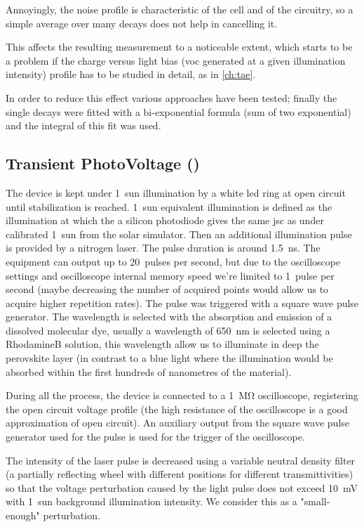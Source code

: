 			Annoyingly, the noise profile is characteristic of the cell and of the circuitry, so a simple average over many decays does not help in cancelling it.

			This affects the resulting measurement to a noticeable extent, which starts to be a problem if the charge versus light bias (\gls{voc} generated at a given illumination intensity) profile has to be studied in detail, as in \cref{ch:tae}.

			In order to reduce this effect various approaches have been tested; finally the single decays were fitted with a bi-exponential formula (sum of two exponential) and the integral of this fit was used.

	\subsection{Transient PhotoVoltage ()}

		The device is kept under 1~sun illumination by a white \gls{led} ring at open circuit until stabilization is reached. 1~sun equivalent illumination is defined as the illumination at which the a silicon photodiode gives the same \gls{jsc} as under calibrated 1~sun from the solar simulator. Then an additional illumination pulse is provided by a nitrogen laser. The pulse duration is around \SI{1.5}{\ns}. The equipment can output up to 20~pulses per second, but due to the oscilloscope settings and oscilloscope internal memory speed we're limited to 1~pulse per second (maybe decreasing the number of acquired points would allow us to acquire higher repetition rates). The pulse was triggered with a square wave pulse generator. The wavelength is selected with the absorption and emission of a dissolved molecular dye, usually a wavelength of \SI{650}{\nm} is selected using a RhodamineB solution\cite{RadiantDyesLaser}, this wavelength allow us to illuminate in deep the perovskite layer (in contrast to a blue light where the illumination would be absorbed within the first hundreds of nanometres of the material).

		During all the process, the device is connected to a \SI{1}{\Mohm} oscilloscope, registering the open circuit voltage profile (the high resistance of the oscilloscope is a good approximation of open circuit). An auxiliary output from the square wave pulse generator used for the pulse is used for the trigger of the oscilloscope.

		The intensity of the laser pulse is decreased using a variable neutral density filter (a partially reflecting wheel with different positions for different transmittivities) so that the voltage perturbation caused by the light pulse does not exceed \SI{10}{\mV} with 1~sun background illumination intensity. We consider this as a "small-enough" perturbation.

